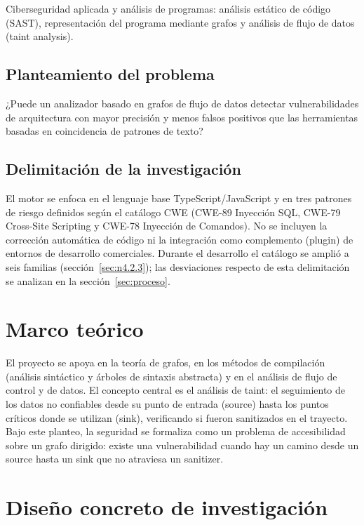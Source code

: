 Ciberseguridad aplicada y análisis de programas: análisis estático de código (SAST), representación del programa mediante grafos y análisis de flujo de datos (taint analysis).

\subsection{Planteamiento del problema}\label{sec:n2.1.2}

¿Puede un analizador basado en grafos de flujo de datos detectar vulnerabilidades de arquitectura con mayor precisión y menos falsos positivos que las herramientas basadas en coincidencia de patrones de texto?

\subsection{Delimitación de la investigación}\label{sec:n2.1.3}

El motor se enfoca en el lenguaje base TypeScript/JavaScript y en tres patrones de riesgo definidos según el catálogo CWE (CWE-89 Inyección SQL, CWE-79 Cross-Site Scripting y CWE-78 Inyección de Comandos). No se incluyen la corrección automática de código ni la integración como complemento (plugin) de entornos de desarrollo comerciales. Durante el desarrollo el catálogo se amplió a seis familias (sección~\ref{sec:n4.2.3}); las desviaciones respecto de esta delimitación se analizan en la sección~\ref{sec:proceso}.

\section{Marco teórico}\label{sec:n2.2}

El proyecto se apoya en la teoría de grafos, en los métodos de compilación (análisis sintáctico y árboles de sintaxis abstracta) y en el análisis de flujo de control y de datos. El concepto central es el análisis de taint: el seguimiento de los datos no confiables desde su punto de entrada (source) hasta los puntos críticos donde se utilizan (sink), verificando si fueron sanitizados en el trayecto. Bajo este planteo, la seguridad se formaliza como un problema de accesibilidad sobre un grafo dirigido: existe una vulnerabilidad cuando hay un camino desde un source hasta un sink que no atraviesa un sanitizer.

\section{Diseño concreto de investigación}\label{sec:n2.3}

